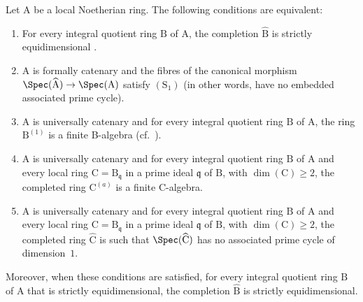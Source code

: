 \begin{theorem}[7.2.5]
\label{IV.7.2.5}
Let $\mathrm{A}$ be a local Noetherian ring.
The following conditions are equivalent:
\begin{enumerate}[label=\emph{\alph*)}]
  \item For every integral quotient ring $\mathrm{B}$ of $\mathrm{A}$, the completion $\widehat{\mathrm{B}}$ is strictly equidimensional .
  \item $\mathrm{A}$ is formally catenary  and the fibres of the canonical morphism $\Spec(\widehat{\mathrm{A}})\to\Spec(\mathrm{A})$ satisfy $(\mathrm{S}_1)$ (in other words, have no embedded associated prime cycle).
  \item $\mathrm{A}$ is universally catenary  and for every integral quotient ring $\mathrm{B}$ of $\mathrm{A}$, the ring $\mathrm{B}^{(1)}$ is a finite B-algebra (cf.\ ).
  \item $\mathrm{A}$ is universally catenary and for every integral quotient ring $\mathrm{B}$ of $\mathrm{A}$ and every local ring $\mathrm{C}=\mathrm{B}_\mathfrak{q}$ in a prime ideal $\mathfrak{q}$ of $\mathrm{B}$, with $\dim(\mathrm{C})\geqslant 2$, the completed ring $\mathrm{C}^{(a)}$ is a finite C-algebra.
  \item $\mathrm{A}$ is universally catenary and for every integral quotient ring $\mathrm{B}$ of $\mathrm{A}$ and every local ring $\mathrm{C}=\mathrm{B}_\mathfrak{q}$ in a prime ideal $\mathfrak{q}$ of $\mathrm{B}$, with $\dim(\mathrm{C})\geqslant 2$, the completed ring $\widehat{\mathrm{C}}$ is such that $\Spec(\widehat{\mathrm{C}})$ has no associated prime cycle of dimension~$1$.
\end{enumerate}
Moreover, when these conditions are satisfied, for every integral quotient ring $\mathrm{B}$ of $\mathrm{A}$ that is strictly equidimensional, the completion $\widehat{\mathrm{B}}$ is strictly equidimensional.
\end{theorem}


